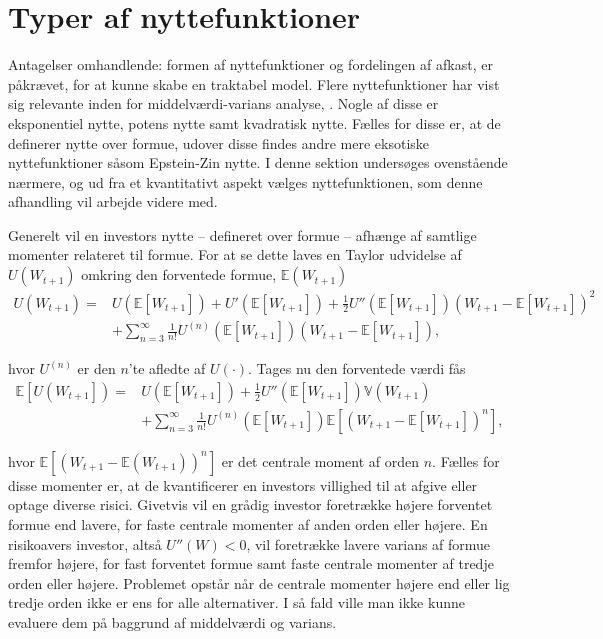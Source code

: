 \documentclass[
  a4paper,
  oneside]{memoir}
\begin{document}
\hypertarget{typnyt}{%
\section{Typer af nyttefunktioner}\label{typnyt}}

Antagelser omhandlende: formen af nyttefunktioner og fordelingen af afkast, er påkrævet, for at kunne skabe en traktabel model. Flere nyttefunktioner har vist sig relevante inden for middelværdi-varians analyse, \citep{CampVic2003}. Nogle af disse er eksponentiel nytte, potens nytte samt kvadratisk nytte. Fælles for disse er, at de definerer nytte over formue, udover disse findes andre mere eksotiske nyttefunktioner såsom Epstein-Zin nytte. I denne sektion undersøges ovenstående nærmere, og ud fra et kvantitativt aspekt vælges nyttefunktionen, som denne afhandling vil arbejde videre med.

Generelt vil en investors nytte -- defineret over formue -- afhænge af samtlige momenter relateret til formue. For at se dette laves en Taylor udvidelse af \(U(W_{t+1})\) omkring den forventede formue, \(\mathbb{E}(W_{t+1})\)
\begin{align*}
U\left(W_{t+1}\right)=&U\left(\mathbb{E}\left[W_{t+1}\right]\right)+U'\left(\mathbb{E}\left[W_{t+1}\right]\right)+\frac{1}{2}U''\left(\mathbb{E}\left[W_{t+1}\right]\right)\left(W_{t+1}-\mathbb{E}\left[W_{t+1}\right]\right)^2\\
&+\sum_{n=3}^\infty \frac{1}{n!}U^{\left(n\right)}\left(\mathbb{E}\left[W_{t+1}\right]\right)\left(W_{t+1}-\mathbb{E}\left[W_{t+1}\right]\right),
\end{align*}

hvor \(U^{(n)}\) er den \(n\)'te afledte af \(U(\cdot)\). Tages nu den forventede værdi fås
\begin{align*}
\mathbb{E}\left[U\left(W_{t+1}\right]\right)=&U\left(\mathbb{E}\left[W_{t+1}\right]\right)+\frac{1}{2}U''\left(\mathbb{E}\left[W_{t+1}\right]\right)\mathbb{V}\left(W_{t+1}\right)\\
&+\sum_{n=3}^\infty \frac{1}{n!} U^{\left(n\right)}\left(\mathbb{E}\left[W_{t+1}\right]\right)\mathbb{E}\left[\left(W_{t+1}-\mathbb{E}\left[W_{t+1}\right]\right)^n\right],
\end{align*}

hvor \(\mathbb{E}\left[(W_{t+1}-\mathbb{E}(W_{t+1}))^n\right]\) er det centrale moment af orden \(n\). Fælles for disse momenter er, at de kvantificerer en investors villighed til at afgive eller optage diverse risici. Givetvis vil en grådig investor foretrække højere forventet formue end lavere, for faste centrale momenter af anden orden eller højere. En risikoavers investor, altså \(U''(W)<0\), vil foretrække lavere varians af formue fremfor højere, for fast forventet formue samt faste centrale momenter af tredje orden eller højere. Problemet opstår når de centrale momenter højere end eller lig tredje orden ikke er ens for alle alternativer. I så fald ville man ikke kunne evaluere dem på baggrund af middelværdi og varians.
\end{document}
